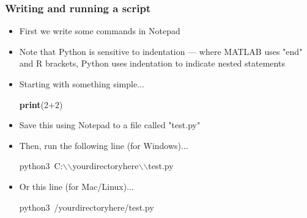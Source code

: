 \documentclass{beamer}\usepackage[]{graphicx}\usepackage[]{color}
\makeatletter
\newcommand{\hlnum}[1]{\textcolor[rgb]{0.686,0.059,0.569}{#1}}%
\newcommand{\hlcom}[1]{\textcolor[rgb]{0.678,0.584,0.686}{\textit{#1}}}%
\newcommand{\hlopt}[1]{\textcolor[rgb]{0,0,0}{#1}}%
\newcommand{\hlstd}[1]{\textcolor[rgb]{0.345,0.345,0.345}{#1}}%
\newcommand{\hlkwa}[1]{\textcolor[rgb]{0.161,0.373,0.58}{\textbf{#1}}}%
\newcommand{\hlkwb}[1]{\textcolor[rgb]{0.69,0.353,0.396}{#1}}%
\newenvironment{kframe}{%
 \def\at@end@of@kframe{}%
 \ifinner\ifhmode%
  \def\at@end@of@kframe{\end{minipage}}%
  \begin{minipage}{\columnwidth}%
 \fi\fi%
 \def\FrameCommand##1{\hskip\@totalleftmargin \hskip-\fboxsep
 \colorbox{shadecolor}{##1}\hskip-\fboxsep
     \hskip-\linewidth \hskip-\@totalleftmargin \hskip\columnwidth}%
 \MakeFramed {\advance\hsize-\width
   \@totalleftmargin\z@ \linewidth\hsize
   \@setminipage}}%
 {\par\unskip\endMakeFramed%
 \at@end@of@kframe}
\newenvironment{knitrout}{}{} %
\let\hlesc\hlstd \let\hlpps\hlstd \let\hllin\hlstd \let\hlslc\hlcom \let\hlppc\hlcom
\makeatother
\begin{document}
\begin{frame}[fragile]
\frametitle{Writing and running a script}
\begin{itemize}
	\item First we write some commands in Notepad 

	\item Note that Python is sensitive to indentation --- where MATLAB uses "end" and R brackets, Python uses indentation to indicate nested statements

	\item Starting with something simple...

\begin{knitrout}
\color{fgcolor}\begin{kframe}
\noindent
\ttfamily
\hlstd{}\hlkwa{print}\hlstd{}\hlopt{(}\hlstd{}\hlnum{2}\hlstd{}\hlopt{+}\hlstd{}\hlnum{2}\hlstd{}\hlopt{)}\hlstd{}\hspace*{\fill}
\mbox{}
\normalfont
\end{kframe}
\end{knitrout}

	\item Save this using Notepad to a file called "test.py"

	\item Then, run the following line (for Windows)...

\begin{knitrout}
\color{fgcolor}\begin{kframe}
\noindent
\ttfamily
\hlstd{python3\ C}\hlopt{:}\hlstd{}\hlesc{$\backslash$$\backslash$}\hlstd{your\textunderscore directory\textunderscore here}\hlesc{$\backslash$$\backslash$}\hlstd{}\hlkwb{test}\hlstd{.py}\hspace*{\fill}
\mbox{}
\normalfont
\end{kframe}
\end{knitrout}

	\item Or this line (for Mac/Linux)...

\begin{knitrout}
\color{fgcolor}\begin{kframe}
\noindent
\ttfamily
\hlstd{python3\ }\hlopt{/}\hlstd{your\textunderscore directory\textunderscore here}\hlopt{/}\hlstd{}\hlkwb{test}\hlstd{.py}\hspace*{\fill}
\mbox{}
\normalfont
\end{kframe}
\end{knitrout}

\end{itemize}
\end{frame}
\end{document}
